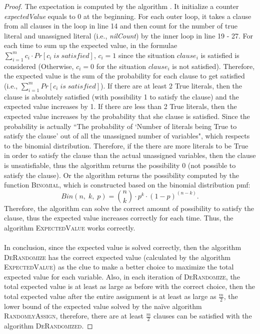 \documentclass[10pt]{article}
\begin{document}
\begin{enumerate}
\begin{mdframed}
\begin{proof}
The expectation is computed by the algorithm . It initialize a counter \textit{expectedValue} equals to 0 at the beginning. For each outer loop, it takes a clause from all clauses in the loop in line 14 and then count for the number of true literal and unassigned literal (i.e., \textit{nilCount}) by the inner loop in line 19 - 27. For each time to sum up the expected value, in the formulae $\sum_{i = 1}^{m}c_i \cdot Pr[c_i \; is \; satisfied]$, $c_i = 1$ since the situation $clause_i$ is satisfied is considered (Otherwise, $c_i = 0$ for the situation $clause_i$ is not satisfied). Therefore, the expected value is the sum of the probability for each clause to get satisfied (i.e., $\sum_{i = 1}^{m}Pr[c_i \; is \; satisfied]$). If there are at least 2 True literals, then the clause is absolutely satisfied (with possibility 1 to satisfy the clause) and the expected value increases by 1. If there are less than 2 True literals, then the expected value increases by the probability that she clause is satisfied. Since the probability is actually ``The probability of `Number of literals being True to satisfy the clause' out of all the unassigned number of variables", which respects to the binomial distribution. Therefore, if the there are more literals to be True in order to satisfy the clause than the actual unassigned variables, then the clause is unsatisfiable, thus the algorithm returns the possibility 0 (not possible to satisfy the clause). Or the algorithm returns the possibility computed by the function \textsc{Binomial}, which is constructed based on the binomial distribution pmf:
\[Bin(n, \; k, \; p) = {n \choose k} \cdot p ^ {k} \cdot (1 - p) ^ {(n - k)}.\]
Therefore, the algorithm can solve the correct amount of possibility to satisfy the clause, thus the expected value increases correctly for each time. Thus, the algorithm \textsc{ExpectedValue} works correctly.\\
\\
In conclusion, since the expected value is solved correctly, then the algorithm \textsc{DeRandomize} has the correct expected value (calculated by the algorithm \textsc{ExpectedValue}) as the clue to make a better choice to maximize the total expected value for each variable. Also, in each iteration of \textsc{DeRandomize}, the total expected value is at least as large as before with the correct choice, then the total expected value after the entire assignment is at least as large as $\frac{m}{2}$, the lower bound of the expected value solved by the na\"ive algorithm \textsc{RandomlyAssign}, therefore, there are at least $\frac{m}{2}$ clauses can be satisfied with the algorithm \textsc{DeRandomized}. 


\end{proof}
\end{mdframed}
\end{enumerate}
\end{document}
